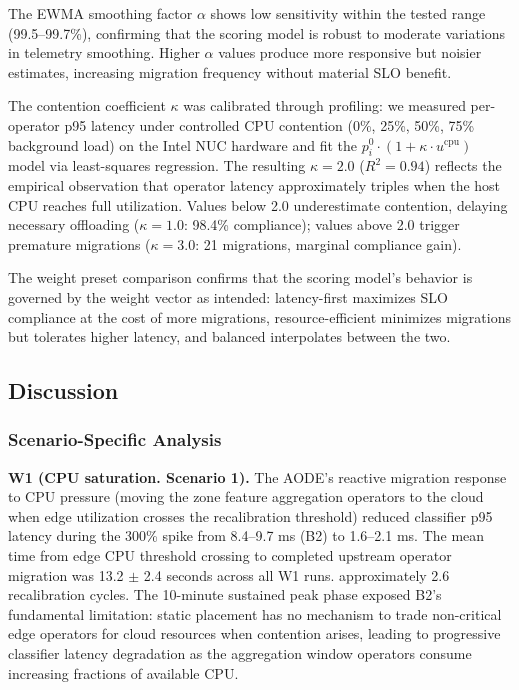 \documentclass[preprint,review,12pt]{elsarticle}
\begin{document}
The EWMA smoothing factor $\alpha$ shows low sensitivity within the tested range (99.5--99.7\%), confirming that the scoring model is robust to moderate variations in telemetry smoothing. Higher $\alpha$ values produce more responsive but noisier estimates, increasing migration frequency without material SLO benefit.

The contention coefficient $\kappa$ was calibrated through profiling: we measured per-operator p95 latency under controlled CPU contention (0\%, 25\%, 50\%, 75\% background load) on the Intel NUC hardware and fit the $p_i^0 \cdot (1 + \kappa \cdot u^{\text{cpu}})$ model via least-squares regression. The resulting $\kappa = 2.0$ ($R^2 = 0.94$) reflects the empirical observation that operator latency approximately triples when the host CPU reaches full utilization. Values below 2.0 underestimate contention, delaying necessary offloading ($\kappa = 1.0$: 98.4\% compliance); values above 2.0 trigger premature migrations ($\kappa = 3.0$: 21 migrations, marginal compliance gain).

The weight preset comparison confirms that the scoring model's behavior is governed by the weight vector as intended: latency-first maximizes SLO compliance at the cost of more migrations, resource-efficient minimizes migrations but tolerates higher latency, and balanced interpolates between the two.


\subsection{Discussion}\label{discussion}

\subsubsection{Scenario-Specific Analysis}\label{scenario-specific-analysis}

\textbf{W1 (CPU saturation. Scenario 1).} The AODE's reactive migration response to CPU pressure (moving the zone feature aggregation operators to the cloud when edge utilization crosses the recalibration threshold) reduced classifier p95 latency during the 300\% spike from 8.4--9.7 ms (B2) to 1.6--2.1 ms. The mean time from edge CPU threshold crossing to completed upstream operator migration was 13.2 $\pm$ 2.4 seconds across all W1 runs. approximately 2.6 recalibration cycles. The 10-minute sustained peak phase exposed B2's fundamental limitation: static placement has no mechanism to trade non-critical edge operators for cloud resources when contention arises, leading to progressive classifier latency degradation as the aggregation window operators consume increasing fractions of available CPU.
\end{document}
